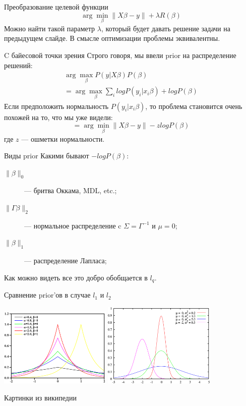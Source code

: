\documentclass[14pt, fleqn, xcolor={dvipsnames, table}]{beamer}
\begin{document}
\begin{frame}{Преобразование целевой функции}
$$
\arg \min_\beta \| X\beta - y\| + \lambda R(\beta)
$$
Можно найти такой параметр $\lambda$, который будет давать решение задачи на предыдущем слайде. В смысле оптимизации проблемы эквивалентны.
\end{frame}


\begin{frame}{C байесовой точки зрения}
Строго говоря, мы ввели prior на распределение решений:
$$\begin{array}{l}
\arg \max_\beta P(y|X\beta) P(\beta) \\
= \arg \max_\beta \sum_i log P(y_i|x_i\beta) + log P(\beta)
\end{array}$$
Если предположить нормальность $P(y_i|x_i\beta)$, то проблема становится очень похожей на то, что мы уже видели:
$$
= \arg \min_\beta \|X \beta - y\| - z log P(\beta)
$$
где $z$ --- ошметки нормальности.
\end{frame}

\begin{frame}{Виды prior}
Какими бывают $-log P(\beta)$:
\begin{description}
  \item[$\|\beta\|_0$] --- бритва Оккама, MDL, etc.;
  \item[$\|\Gamma\beta\|_2$] --- нормальное распределение c $\Sigma = \Gamma^{-1}$ и $\mu = 0$;
  \item[$\|\beta\|_1$] --- распределение Лапласа;
\end{description}
Как можно видеть все это добро обобщается в $l_q$.
\end{frame}

\begin{frame}{Сравнение prior'ов в случае $l_1$ и $l_2$}
\begin{center}
\includegraphics[width=0.4\textwidth,height=0.5\textheight]{800px-Laplace_distribution.png} 
\includegraphics[width=0.4\textwidth,height=0.5\textheight]{800px-Normal_distribution.png} 
\end{center}
Картинки из википедии
\end{frame}
\end{document}
